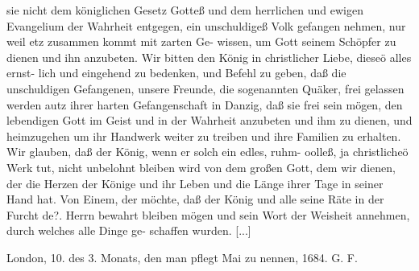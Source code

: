 {    sie nicht dem königlichen Gesetz Gotteß und dem herrlichen und
    ewigen Evangelium der Wahrheit entgegen, ein unschuldigeß Volk
    gefangen nehmen, nur weil etz zusammen kommt mit zarten Ge-
    wissen, um Gott seinem Schöpfer zu dienen und ihn anzubeten.
    Wir bitten den König in christlicher Liebe, dieseö alles ernst-
    lich und eingehend zu bedenken, und Befehl zu geben, daß die
    unschuldigen Gefangenen, unsere Freunde, die sogenannten Quäker,
    frei gelassen werden autz ihrer harten Gefangenschaft in Danzig,
    daß sie frei sein mögen, den lebendigen Gott im Geist und in der
    Wahrheit anzubeten und ihm zu dienen, und heimzugehen um
    ihr Handwerk weiter zu treiben und ihre Familien zu erhalten.
    Wir glauben, daß der König, wenn er solch ein edles, ruhm-
    oolleß, ja christlicheö Werk tut, nicht unbelohnt bleiben wird
    von dem großen Gott, dem wir dienen, der die Herzen der
    Könige und ihr Leben und die Länge ihrer Tage in seiner
    Hand hat.
    Von Einem, der möchte, daß der König und alle seine
    Räte in der Furcht de?. Herrn bewahrt bleiben mögen und
    sein Wort der Weisheit annehmen, durch welches alle Dinge ge-
    schaffen wurden. [...]
    \bigskip
    \begin{flushright}
    London, 10. des 3. Monats, den man pflegt Mai zu nennen, 1684.
    G. F.\end{flushright}
}


